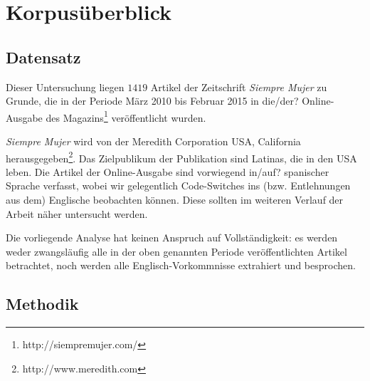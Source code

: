 \section{Korpusüberblick}
\label{chap:corpus}


\subsection{Datensatz}

Dieser Untersuchung liegen $1419$ Artikel der Zeitschrift \textit{Siempre Mujer} zu Grunde,
die in der Periode März 2010 bis Februar 2015 in die/der? Online-Ausgabe des Magazins\footnote{http://siempremujer.com/} veröffentlicht wurden.

\textit{Siempre Mujer} wird von der Meredith Corporation USA, California herausgegeben\footnote{http://www.meredith.com}.
Das Zielpublikum der Publikation sind Latinas, die in den USA leben. %
Die Artikel der Online-Ausgabe sind vorwiegend in/auf? spanischer Sprache verfasst,
wobei wir gelegentlich Code-Switches ins (bzw. Entlehnungen aus dem) Englische beobachten können.
Diese sollten im weiteren Verlauf der Arbeit näher untersucht werden.

Die vorliegende Analyse hat keinen Anspruch auf Vollständigkeit:
es werden weder zwangsläufig alle in der oben genannten Periode veröffentlichten Artikel betrachtet,
noch werden alle Englisch-Vorkommnisse extrahiert und besprochen.



\subsection{Methodik}

